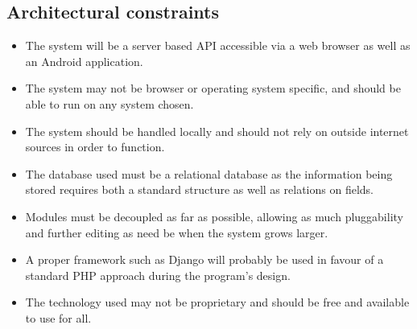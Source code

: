 \documentclass{article}
\begin{document}
	\subsection{Architectural constraints}\label{subsec:constraints}
		\begin{itemize}
			\item The system will be a server based API accessible via a web browser as well as an Android application.
			\item The system may not be browser or operating system specific, and should be able to run on any system chosen.
			\item The system should be handled locally and should not rely on outside internet sources in order to function.
			\item The database used must be a relational database as the information being stored requires both a standard structure as well as relations on fields.
			\item Modules must be decoupled as far as possible, allowing as much pluggability and further editing as need be when the system grows larger.
			\item A proper framework such as Django will probably be used in favour of a standard PHP approach during the program's design.
			\item The technology used may not be proprietary and should be free and available to use for all.
		\end{itemize}

	
\end{document}
